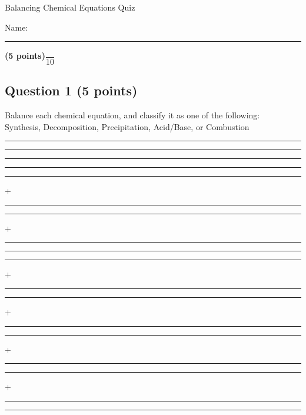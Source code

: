 \documentclass[12pt, letterpaper]{memoir}
\begin{document}
	\begin{center}
		{\large Balancing Chemical Equations Quiz}
	\end{center}
	{\large Name: \rule[-1mm]{4in}{.1pt} {\bfseries (5 points)}\hspace{4em}$\dfrac{~}{10}$} 
	
	\subsection*{Question 1 (5 points)}
	Balance each chemical equation, and classify it as one of the following: \\Synthesis, Decomposition, Precipitation, Acid/Base, or Combustion
	
	{\large
		\vspace{2em}
		\rule[-1mm]{0.35in}{.1pt}  \rule[-1mm]{0.35in}{.1pt} \rule[-1mm]{0.35in}{.1pt} \rule[-1mm]{0.35in}{.1pt}
		
		\vspace{5em}
		\rule[-1mm]{0.35in}{.1pt} + \rule[-1mm]{0.35in}{.1pt} \rule[-1mm]{0.35in}{.1pt} + \rule[-1mm]{0.35in}{.1pt}
			
		\vspace{5em}
		\rule[-1mm]{0.35in}{.1pt} \rule[-1mm]{0.35in}{.1pt} + \rule[-1mm]{0.35in}{.1pt}
		
		\vspace{5em}
		\rule[-1mm]{0.35in}{.1pt} + \rule[-1mm]{0.35in}{.1pt} \rule[-1mm]{0.35in}{.1pt} + \rule[-1mm]{0.35in}{.1pt}
		
		\vspace{5em}
		\rule[-1mm]{0.35in}{.1pt} + \rule[-1mm]{0.35in}{.1pt} \rule[-1mm]{0.35in}{.1pt}
	}
\end{document}
